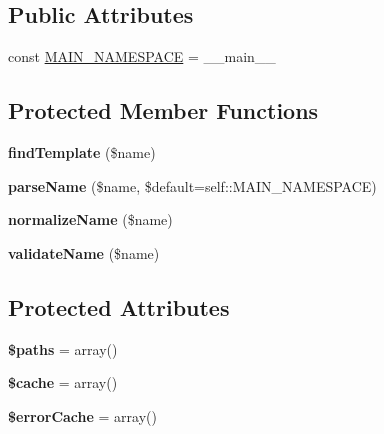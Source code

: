 \subsection*{Public Attributes}
\begin{DoxyCompactItemize}
\item 
const \hyperlink{classTwig__Loader__Filesystem_a50e08d4ee489fcf7788fa4197ce7fc38}{M\+A\+I\+N\+\_\+\+N\+A\+M\+E\+S\+P\+A\+CE} = \textquotesingle{}\+\_\+\+\_\+main\+\_\+\+\_\+\textquotesingle{}
\end{DoxyCompactItemize}
\subsection*{Protected Member Functions}
\begin{DoxyCompactItemize}
\item 
{\bfseries find\+Template} (\$name)\hypertarget{classTwig__Loader__Filesystem_aebffda0b78e6f6286359981825b60aa1}{}\label{classTwig__Loader__Filesystem_aebffda0b78e6f6286359981825b60aa1}

\item 
{\bfseries parse\+Name} (\$name, \$default=self\+::\+M\+A\+I\+N\+\_\+\+N\+A\+M\+E\+S\+P\+A\+CE)\hypertarget{classTwig__Loader__Filesystem_a57486fcf14301c39778a396540b2854d}{}\label{classTwig__Loader__Filesystem_a57486fcf14301c39778a396540b2854d}

\item 
{\bfseries normalize\+Name} (\$name)\hypertarget{classTwig__Loader__Filesystem_ad9e171393ab22bdf6a4517f68350cbac}{}\label{classTwig__Loader__Filesystem_ad9e171393ab22bdf6a4517f68350cbac}

\item 
{\bfseries validate\+Name} (\$name)\hypertarget{classTwig__Loader__Filesystem_af531f0a3353ebdaecd352b144edfb79f}{}\label{classTwig__Loader__Filesystem_af531f0a3353ebdaecd352b144edfb79f}

\end{DoxyCompactItemize}
\subsection*{Protected Attributes}
\begin{DoxyCompactItemize}
\item 
{\bfseries \$paths} = array()\hypertarget{classTwig__Loader__Filesystem_aace741d9bbb405c800b24471f0702569}{}\label{classTwig__Loader__Filesystem_aace741d9bbb405c800b24471f0702569}

\item 
{\bfseries \$cache} = array()\hypertarget{classTwig__Loader__Filesystem_a91c49737852b02071ab24a3a2430818a}{}\label{classTwig__Loader__Filesystem_a91c49737852b02071ab24a3a2430818a}

\item 
{\bfseries \$error\+Cache} = array()\hypertarget{classTwig__Loader__Filesystem_a05cef3c1301a48497d0d15a2b52e8a0e}{}\label{classTwig__Loader__Filesystem_a05cef3c1301a48497d0d15a2b52e8a0e}

\end{DoxyCompactItemize}



